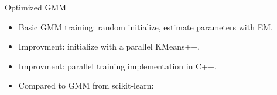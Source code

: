 \begin{frame}{Optimized GMM}
  \begin{itemize}
    \item Basic GMM training: random initialize, estimate parameters with EM.
    \item Improvment: initialize with a parallel KMeans++.
    \item Improvment: parallel training implementation in C++.
    \item Compared to GMM from scikit-learn:
  \end{itemize}

  \begin{columns}
    \begin{column}{0.5\textwidth}
      \begin{center}
      \end{center}
      \vspace{0.6em}
    \end{column}
    \begin{column}{0.6\textwidth}
    \end{column}
  \end{columns}
  \vspace{2em}


\end{frame}
